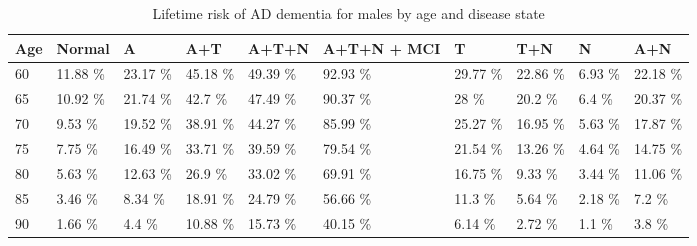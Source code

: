 \begin{table}[ht]
\centering
\begin{tabular}{llllllllll}
  \hline
Age & Normal & A & A+T & A+T+N & A+T+N + MCI & T & T+N & N & A+N \\ 
  \hline
60 & 11.88 \% & 23.17 \% & 45.18 \% & 49.39 \% & 92.93 \% & 29.77 \% & 22.86 \% & 6.93 \% & 22.18 \% \\ 
  65 & 10.92 \% & 21.74 \% & 42.7 \% & 47.49 \% & 90.37 \% & 28 \% & 20.2 \% & 6.4 \% & 20.37 \% \\ 
  70 & 9.53 \% & 19.52 \% & 38.91 \% & 44.27 \% & 85.99 \% & 25.27 \% & 16.95 \% & 5.63 \% & 17.87 \% \\ 
  75 & 7.75 \% & 16.49 \% & 33.71 \% & 39.59 \% & 79.54 \% & 21.54 \% & 13.26 \% & 4.64 \% & 14.75 \% \\ 
  80 & 5.63 \% & 12.63 \% & 26.9 \% & 33.02 \% & 69.91 \% & 16.75 \% & 9.33 \% & 3.44 \% & 11.06 \% \\ 
  85 & 3.46 \% & 8.34 \% & 18.91 \% & 24.79 \% & 56.66 \% & 11.3 \% & 5.64 \% & 2.18 \% & 7.2 \% \\ 
  90 & 1.66 \% & 4.4 \% & 10.88 \% & 15.73 \% & 40.15 \% & 6.14 \% & 2.72 \% & 1.1 \% & 3.8 \% \\ 
   \hline
\end{tabular}
\caption{Lifetime risk of AD dementia for males by age and disease state} 
\end{table}
